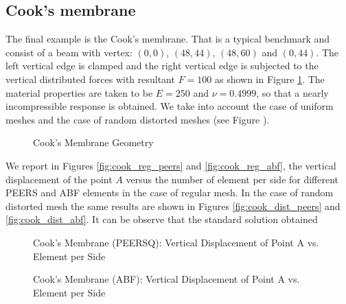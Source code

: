 \subsection{Cook's membrane}
The final example is the Cook's membrane. That is a typical benchmark and consist of a beam with vertex: $(0,0)$, $(48,44)$, $(48,60)$ and $(0,44)$.
The left vertical edge is clamped and the right vertical edge is subjected to the vertical distributed forces with resultant $F=100$ as shown in Figure \ref{fig:cook_membrane}.
The material properties are taken to be $E = 250$ and $\nu = 0.4999$, so that a nearly incompressible response is obtained.
We take into account the case of uniform meshes and the case of random distorted meshes (see Figure ).
\begin{figure}[!ht]
\begin{center}

\caption{Cook's Membrane Geometry \label{fig:cook_membrane}}
\end{center}
\end{figure}
We report in Figures \ref{fig:cook_reg_peers} and \ref{fig:cook_reg_abf}, the vertical displacement of the point $A$ versus the number of element per side for different PEERS and ABF elements in the case of regular mesh.
In the case of random distorted mesh the same results are shown in Figures  \ref{fig:cook_dist_peers} and \ref{fig:cook_dist_abf}.
It can be observe that the standard solution obtained  
%
\begin{figure}[!ht]
\begin{center}
\caption{Cook's Membrane (PEERSQ): Vertical Displacement of Point A vs. Element per Side}
\end{center}
\end{figure}
%
\begin{figure}[!ht]
\begin{center}
\caption{Cook's Membrane (ABF): Vertical Displacement of Point A vs. Element per Side}
\end{center}
\end{figure}